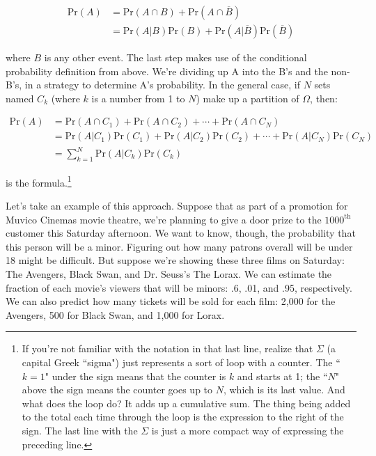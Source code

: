 \begin{align*}
\text{Pr}(A) &= \text{Pr}(A \cap B) + \text{Pr}(A \cap \overline{B}) \\
&= \text{Pr}(A|B) \text{Pr}(B) + \text{Pr}(A|\overline{B}) \text{Pr}(\overline{B})
\end{align*}

where $B$ is any other event. The last step makes use of the conditional
probability definition from above. We're dividing up A into the B's and the
non-B's, in a strategy to determine A's probability. In the general case,
if $N$ sets named $C_k$ (where $k$ is a number from 1 to $N$) make up a
partition of $\Omega$, then:

\begin{align*}
\text{Pr}(A) &= \text{Pr}(A \cap C_1) +
\text{Pr}(A \cap C_2) + 
\cdots +
\text{Pr}(A \cap C_N) \\
&= \text{Pr}(A|C_1) \text{Pr}(C_1) +
\text{Pr}(A|C_2) \text{Pr}(C_2) +
\cdots +
\text{Pr}(A|C_N) \text{Pr}(C_N) \\
&= \sum_{k=1}^N{\text{Pr}(A|C_k) \text{Pr}(C_k)}
\end{align*}

is the formula.\footnote{If you're not familiar with the notation in that
last line, realize that $\Sigma$ (a capital Greek ``sigma") just represents
a sort of loop with a counter. The ``$k=1$" under the sign means that the
counter is $k$ and starts at 1; the ``$N$" above the sign means the counter
goes up to $N$, which is its last value. And what does the loop do? It adds
up a cumulative sum. The thing being added to the total each time through
the loop is the expression to the right of the sign. The last line with the
$\Sigma$ is just a more compact way of expressing the preceding line.}

Let's take an example of this approach. Suppose that as part of a promotion
for Muvico Cinemas movie theatre, we're planning to give a door prize to
the $1000^{\text{th}}$ customer this Saturday afternoon. We want to know,
though, the probability that this person will be a minor. Figuring out how
many patrons overall will be under 18 might be difficult. But suppose we're
showing these three films on Saturday: The Avengers, Black Swan, and Dr.
Seuss's The Lorax. We can estimate the fraction of each movie's viewers
that will be minors: .6, .01, and .95, respectively. We can also predict
how many tickets will be sold for each film: 2,000 for the Avengers, 500
for Black Swan, and 1,000 for Lorax.

